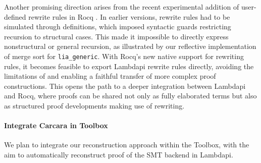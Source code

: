 Another promising direction arises from the recent experimental addition of user-defined rewrite rules in Rocq \cite{rw-rocq}. 
In earlier versions, rewrite rules had to be simulated through \textcolor{lpurple}{\textbf{}} definitions, which imposed syntactic guards restricting recursion to structural cases. 
This made it impossible to directly express nonstructural or general recursion, as illustrated by our reflective implementation of merge sort for \texttt{lia\_generic}. 
With Rocq’s new native support for rewriting rules, it becomes feasible to export Lambdapi rewrite rules directly, avoiding the limitations of \textcolor{lpurple}{\textbf{}} and enabling a faithful transfer of more complex proof constructions. 
This opens the path to a deeper integration between Lambdapi and Rocq, where proofs can be shared not only as fully elaborated terms but also as structured proof developments making use of rewriting.

\paragraph{Integrate Carcara in \tlaplus Toolbox}
We plan to integrate our reconstruction approach within the \tlaplus Toolbox, with the aim to automatically reconstruct proof of the SMT backend in Lambdapi.

